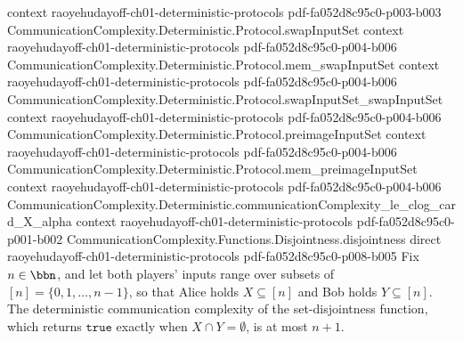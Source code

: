 \begin{theorem}
  {context}
  {raoyehudayoff-ch01-deterministic-protocols}
  {pdf-fa052d8c95c0-p003-b003}
\proofstep
  {CommunicationComplexity.Deterministic.Protocol.swapInputSet}
  {context}
  {raoyehudayoff-ch01-deterministic-protocols}
  {pdf-fa052d8c95c0-p004-b006}
\proofstep
  {CommunicationComplexity.Deterministic.Protocol.mem_swapInputSet}
  {context}
  {raoyehudayoff-ch01-deterministic-protocols}
  {pdf-fa052d8c95c0-p004-b006}
\proofstep
  {CommunicationComplexity.Deterministic.Protocol.swapInputSet_swapInputSet}
  {context}
  {raoyehudayoff-ch01-deterministic-protocols}
  {pdf-fa052d8c95c0-p004-b006}
\proofstep
  {CommunicationComplexity.Deterministic.Protocol.preimageInputSet}
  {context}
  {raoyehudayoff-ch01-deterministic-protocols}
  {pdf-fa052d8c95c0-p004-b006}
\proofstep
  {CommunicationComplexity.Deterministic.Protocol.mem_preimageInputSet}
  {context}
  {raoyehudayoff-ch01-deterministic-protocols}
  {pdf-fa052d8c95c0-p004-b006}
\proofstep
  {CommunicationComplexity.Deterministic.communicationComplexity_le_clog_card_X_alpha}
  {context}
  {raoyehudayoff-ch01-deterministic-protocols}
  {pdf-fa052d8c95c0-p001-b002}
\proofstep
  {CommunicationComplexity.Functions.Disjointness.disjointness}
  {direct}
  {raoyehudayoff-ch01-deterministic-protocols}
  {pdf-fa052d8c95c0-p008-b005}
Fix $n \in \bbn$, and let both players' inputs range over subsets of $[n] = \{0, 1,
\dots, n-1\}$, so that Alice holds $X \subseteq [n]$ and Bob holds $Y \subseteq [n]$.
The deterministic communication complexity of the set-disjointness function, which
returns $\mathtt{true}$ exactly when $X \cap Y = \emptyset$, is at most $n + 1$.
\end{theorem}

